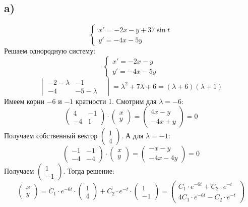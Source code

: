 \documentclass[a4paper,12pt]{article}
\begin{document}
\subsection*{a)}
\[
\begin{cases}
x' = -2x - y + 37 \sin t \\
y' = -4x - 5y
\end{cases}
\]
Решаем однородную систему:
\[
\begin{cases}
x' = -2x - y  \\
y' = -4x - 5y
\end{cases}
\]
\[
\begin{vmatrix}
-2 - \lambda & -1 \\
-4 & -5 - \lambda &
\end{vmatrix} 
=
\lambda^2 + 7 \lambda+ 6 = (\lambda + 6)(\lambda + 1)
\]
Имеем корни $-6$ и $-1$ кратности 1. Смотрим для $\lambda = -6$:
\[
\begin{pmatrix}
4& -1 \\
-4 & 1 
\end{pmatrix}
\cdot
\begin{pmatrix}
x \\ y
\end{pmatrix} = 
\left(\begin{matrix}
4x-y \\
-4x+y
\end{matrix}\right)
= 0
\]
Получаем собственный вектор 
$\begin{pmatrix}
1 \\ 4
\end{pmatrix}$.
А для $\lambda = -1$:
\[
\begin{pmatrix}
-1& -1 \\
-4 & -4 
\end{pmatrix}
\cdot
\begin{pmatrix}
x \\ y
\end{pmatrix} = 
\left(\begin{matrix}
-x-y \\
-4x-4y
\end{matrix}\right)
= 0
\]
Получаем
$\begin{pmatrix}
1 \\ -1
\end{pmatrix}$.
Тогда решение:
\[
\begin{pmatrix}
x \\ y
\end{pmatrix} 
=
C_1 \cdot e^{-6t} \cdot  \begin{pmatrix}
1 \\ 4
\end{pmatrix} 
+ C_2 \cdot e^{-t} \cdot  \begin{pmatrix}
1 \\ -1
\end{pmatrix} 
=
\begin{pmatrix}
C_1 \cdot e^{-6t} + C_2 \cdot e^{-t} \\
4 C_1 \cdot e^{-6t} - C_2 \cdot e^{-t}
\end{pmatrix}
\]
\end{document}
